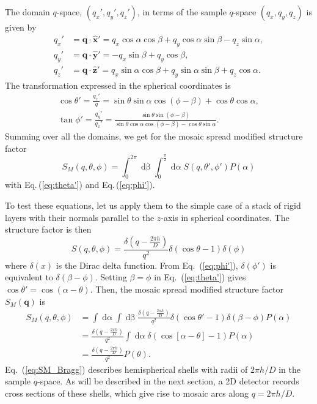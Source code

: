 The domain $q$-space, $(q_x',q_y',q_z')$, in terms of the sample $q$-space 
$(q_x,q_y,q_z)$ is given by
\begin{align}
  q_x' &= \mathbf{q} \cdot \mathbf{\hat{x}'} 
  = q_x\cos\alpha\cos\beta + q_y\cos\alpha\sin\beta -q_z\sin\alpha, 
  \label{eq:qx'} \\
  q_y' &= \mathbf{q} \cdot \mathbf{\hat{y}'} 
  = -q_x\sin\beta + q_y\cos\beta, 
  \label{eq:qy'} \\
  q_z' &= \mathbf{q} \cdot \mathbf{\hat{z}'} 
  = q_x\sin\alpha\cos\beta + q_y\sin\alpha\sin\beta + q_z\cos\alpha.
  \label{eq:qz'}
\end{align}
The transformation expressed in the spherical coordinates is 
\begin{align}
  \cos\theta' = \frac{q_z'}{q} 
              = \sin\theta\sin\alpha\cos(\phi-\beta) + \cos\theta\cos\alpha, 
               \label{eq:theta'}\\
  \tan\phi' 
    = \frac{q_y'}{q_x'}
    = \frac{\sin\theta\sin(\phi-\beta)}{\sin\theta\cos\alpha\cos(\phi-\beta) 
                                       -\cos\theta\sin\alpha}.
  \label{eq:phi'}
\end{align}
Summing over all the domains, we get 
for the mosaic spread modified structure factor
\begin{equation}
  S_M(q,\theta,\phi) = \int_0^{2\pi}\mathop{d\beta} \int_0^{\frac{\pi}{2}} 
  \mathop{d\alpha} S(q,\theta',\phi')P(\alpha)
  \label{eq:SM}
\end{equation}
with Eq.\,(\ref{eq:theta'}) and Eq.\,(\ref{eq:phi'}). 

To test these equations, let us apply them to the simple case of 
a stack of rigid layers with their normals parallel to the $z$-axis 
in spherical coordinates.  The structure factor is then
\begin{equation}
  S(q,\theta,\phi) = \frac{\delta(q-\frac{2\pi h}{D})}{q^2} 
  \delta(\cos\theta-1) \delta(\phi)
  \label{eq:Bragg_spherical}
\end{equation}
where $\delta(x)$ is the Dirac delta function. 
From Eq.~(\ref{eq:phi'}), $\delta(\phi')$ is equivalent to
$\delta(\beta-\phi)$. Setting $\beta=\phi$ in Eq.~(\ref{eq:theta'}) gives
$\cos\theta'=\cos(\alpha-\theta)$. 
Then, the mosaic spread modified structure factor $S_M(\mathbf{q})$ is
\begin{align}
  S_M(q,\theta,\phi) &= \int\mathop{d\alpha}\int\mathop{d\beta}
  \frac{\delta(q-\frac{2\pi h}{D})}{q^2} \delta(\cos\theta'-1) \delta(\beta-\phi)P(\alpha) \nonumber\\
  &= \frac{\delta(q-\frac{2\pi h}{D})}{q^2} \int\mathop{d\alpha} \delta(\cos[\alpha-\theta]-1)P(\alpha)\nonumber\\
  &= \frac{\delta(q-\frac{2\pi h}{D})}{q^2}P(\theta).
  \label{eq:SM_Bragg}
\end{align}
Eq.~(\ref{eq:SM_Bragg}) describes hemispherical shells with
radii of $2\pi h/D$ in the sample $q$-space. As will be described
in the next section, a 2D detector records cross sections of these shells,
which give rise to mosaic arcs along $q=2\pi h/D$. 

